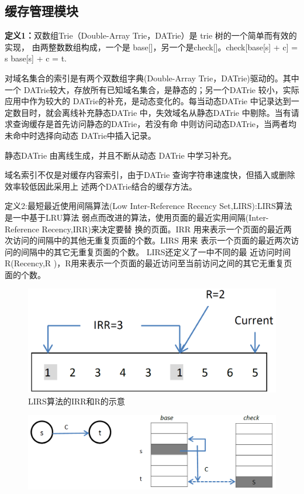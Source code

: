 

\subsection{缓存管理模块} 
\textbf{定义1：}双数组Trie（Double-Array  Trie，DATrie）是 trie 树的一个简单而有效的实现，
由两整数数组构成，一个是 base[]，另一个是check[]。check[base[s] + c] = s base[s]
+ c = t.


\par{对域名集合的索引是有两个双数组字典(Double-Array  Trie，DATrie)驱动的。其中
	一个 DATrie较大，存放所有已知域名集合，是静态的；另一个DATrie 较小，实际应用中作为较大的
	DATrie的补充，是动态变化的。每当动态DATrie 中记录达到一定数目时，就会离线补充静态DATrie
	中，失效域名从静态DATrie 中剔除。当有请求查询缓存是首先访问静态的DATrie，若没有命
	中则访问动态DATrie，当两者均未命中时选择向动态 DATrie中插入记录。 
}
\par{ 静态DATrie 由离线生成，并且不断从动态 DATrie 中学习补充。 }
\par{ 域名索引不仅是对缓存内容索引，由于DATrie 查询字符串速度快，但插入或删除效率较低因此采用上
	述两个DATrie结合的缓存方法。 }
\par{ 定义2:最短最近使用间隔算法(Low  Inter-Reference  Recency  Set,LIRS):LIRS算法是一中基于LRU算法
	弱点而改进的算法，使用页面的最近实用间隔(Inter-Reference Recency,IRR)来决定要替
	换的页面。IRR 用来表示一个页面的最近两次访问的间隔中的其他无重复页面的个数。LIRS 用来
	表示一个页面的最近两次访问的间隔中的其它无重复页面的个数。 LIRS还定义了一中不同的最
	近访问时间R(Recency,R )，R用来表示一个页面的最近访问至当前访问之间的其它无重复页面的个数。 }
\begin{figure}[H]
\centering
\includegraphics[keepaspectratio, scale=0.4]{pitures/irr.png}
\caption{LIRS算法的IRR和R的示意} 
\end{figure}

\begin{figure}[H]
\centering
\includegraphics[keepaspectratio, scale=0.4]{pitures/aaa.png}
\caption{} 
\end{figure}

